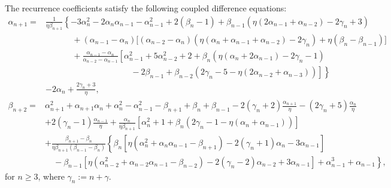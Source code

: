 \documentclass[10pt,a4paper]{amsart}
\begin{document}
\begin{theorem}
The recurrence coefficients satisfy the following coupled difference equations:
\begin{equation}\label{diff-al}
\begin{aligned}
\alpha_{n+1}=&\frac{1}{\eta\beta_{n+1}}\left\{-3\alpha_{n}^2-2\alpha_{n}\alpha_{n-1}-\alpha_{n-1}^2+2(\beta_{n}-1)+\beta_{n-1}(\eta(2\alpha_{n-1}+\alpha_{n-2})-2\gamma_{n}+3)\right.\\
&\left.\qquad\quad\,+(\alpha_{n-1}-\alpha_{n})\big[(\alpha_{n-2}-\alpha_{n})\left(\eta(\alpha_{n}+\alpha_{n-1}+\alpha_{n-2})-2\gamma_n\right)+\eta(\beta_n-\beta_{n-1})\big]\right.\\
&\left.\qquad\quad\,+\frac{\alpha_{n-1}-\alpha_{n}}{\alpha_{n-2}-\alpha_{n-1}}\left[\alpha_{n-1}^2+5\alpha_{n-2}^2+2+\beta_{n}\left(\eta(\alpha_{n}+2\alpha_{n-1})-2\gamma_{n}-1\right)\right.\right.\\
&\left.\left.\quad\qquad\qquad\qquad\qquad\quad\,-2\beta_{n-1}+\beta_{n-2}\left(2\gamma_{n}-5-\eta(2\alpha_{n-2}+\alpha_{n-3})\right)\right]\right\}\\
&-2\alpha_{n}+\frac{2\gamma_{n}+3}{\eta},
\end{aligned}
\end{equation}
\begin{equation}\label{diff-bt}
	\begin{aligned}
\beta_{n+2}=&\alpha_{n+1}^2+\alpha_{n+1}\alpha_n+\alpha_{n}^2-\alpha_{n-1}^2-\beta_{n+1}+\beta_n+\beta_{n-1}-2(\gamma_{n}+2)\frac{\alpha_{n+1}}{\eta}-(2\gamma_{n}+5)\frac{\alpha_{n}}{\eta}\\
&+2(\gamma_n-1)\frac{\alpha_{n-1}}{\eta}+\frac{\alpha_{n}}{\eta\beta_{n+1}}\left[\alpha_n^2+1+\beta_{n}\left(2\gamma_{n}-1-\eta(\alpha_{n}+\alpha_{n-1})\right)\right]\\
&+\frac{\beta_{n+1}-\beta_{n}}{\eta\beta_{n+1}(\beta_{n-1}-\beta_{n})}\left\{\beta_{n}\left[\eta(\alpha_{n}^2+\alpha_n\alpha_{n-1}-\beta_{n+1})-2(\gamma_{n}+1)\alpha_{n}-3\alpha_{n-1}\right]\right.\\ &\left.\quad-\beta_{n-1}\left[\eta(\alpha_{n-2}^2+\alpha_{n-2}\alpha_{n-1}-\beta_{n-2})-2(\gamma_{n}-2)\alpha_{n-2}+3\alpha_{n-1}\right]+\alpha_{n-1}^3+\alpha_{n-1}\right\},
	\end{aligned}
\end{equation}
for $n\geq3$, where $\gamma_{n}:=n+\gamma$.
	\end{theorem}
\end{document}
